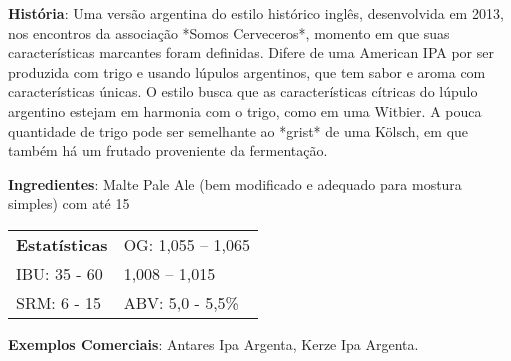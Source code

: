 \textbf{História}: Uma versão argentina do estilo histórico inglês, desenvolvida em 2013, nos encontros da associação *Somos Cerveceros*, momento em que suas características marcantes foram definidas. Difere de uma American IPA por ser produzida com trigo e usando lúpulos argentinos, que tem sabor e aroma com características únicas. O estilo busca que as características cítricas do lúpulo argentino estejam em harmonia com o trigo, como em uma Witbier. A pouca quantidade de trigo pode ser semelhante ao *grist* de uma Kölsch, em que também há um frutado proveniente da fermentação.

\textbf{Ingredientes}: Malte Pale Ale (bem modificado e adequado para mostura simples) com até 15%

\begin{tabular}{@{}p{35mm}p{35mm}@{}}
  \textbf{Estatísticas} & OG: 1,055 – 1,065 \\
  IBU: 35 - 60 & 1,008 – 1,015 \\
  SRM: 6 - 15 & ABV: 5,0 - 5,5\%
\end{tabular}

\textbf{Exemplos Comerciais}: Antares Ipa Argenta, Kerze Ipa Argenta.
